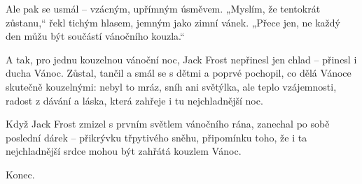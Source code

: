 \documentclass{article}
\begin{document}
Ale pak se usmál – vzácným, upřímným úsměvem. „Myslím, že tentokrát zůstanu,“ řekl tichým hlasem, jemným jako zimní vánek. „Přece jen, ne každý den můžu být součástí vánočního kouzla.“

A tak, pro jednu kouzelnou vánoční noc, Jack Frost nepřinesl jen chlad – přinesl i ducha Vánoc. Zůstal, tančil a smál se s dětmi a poprvé pochopil, co dělá Vánoce skutečně kouzelnými: nebyl to mráz, sníh ani světýlka, ale teplo vzájemnosti, radost z dávání a láska, která zahřeje i tu nejchladnější noc.

Když Jack Frost zmizel s prvním světlem vánočního rána, zanechal po sobě poslední dárek – přikrývku třpytivého sněhu, připomínku toho, že i ta nejchladnější srdce mohou být zahřátá kouzlem Vánoc.

Konec.
\end{document}
